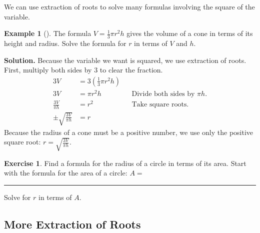 \documentclass[10pt,]{book}
\newcommand{\fillin}[1]{\rule{#1em}{0.1ex}}
\theoremstyle{plain}
\theoremstyle{definition}
\theoremstyle{definition}
\newtheorem{example}[theorem]{Example}
\theoremstyle{definition}
\newtheorem{exercise}[theorem]{Exercise}
\newcommand{\amp}{ & }
\begin{document}
    We can use extraction of roots to solve many formulas involving the square of the variable.
%
\begin{example}[]\label{example-volume-cone}
The formula \(V = \frac{1}{3} πr^2h\) gives the volume of a cone in terms of its height and radius. Solve the formula for \(r\) in terms of \(V\) and \(h\).
\par\medskip\noindent%
\textbf{Solution.}\quad 
    Because the variable we want is squared, we use extraction of roots. First, multiply both sides by \(3\) to clear the fraction.
    \begin{equation*}
        \begin{aligned}
        3V \amp = 3(\frac{1}{3} πr^2h)\\
        3V \amp = πr^2h \amp\amp \text{Divide both sides by } πh.\\
        \frac{3V}{πh}\amp= r^2 \amp\amp \text{Take square roots.}\\
        \pm\sqrt{\frac{3V}{πh}}\amp= r
        \end{aligned}
    \end{equation*}
    Because the radius of a cone must be a positive number, we use only the positive square root: 
    \(r = \sqrt{\frac{3V}{πh}}\).
\end{example}
\begin{exercise}\label{exercise-area-circle}
Find a formula for the radius of a circle in terms of its area.%
Start with the formula for the area of a circle: \(A =\) \fillin{3.636363636363636}%
\par
Solve for \(r\) in terms of \(A\).%
\end{exercise}
\typeout{************************************************}
\typeout{************************************************}
\subsection[More Extraction of Roots]{More Extraction of Roots}\label{subsection-3}
\end{document}
